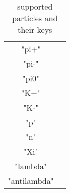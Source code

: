 \documentclass[10pt]{article}
\begin{document}
\begin{table}
\caption{supported particles and their keys}
\begin{center}
\begin{tabular}{|c|c|}
"pi+"&\\
"pi-"&\\
"pi0"&\\
"K+"&\\
"K-"&\\
"p"&\\
"n"&\\
"Xi"&\\
"lambda"&\\
"antilambda"
\end{tabular}
\end{center}
\label{supported particles}
\end{table}%
\end{document}
